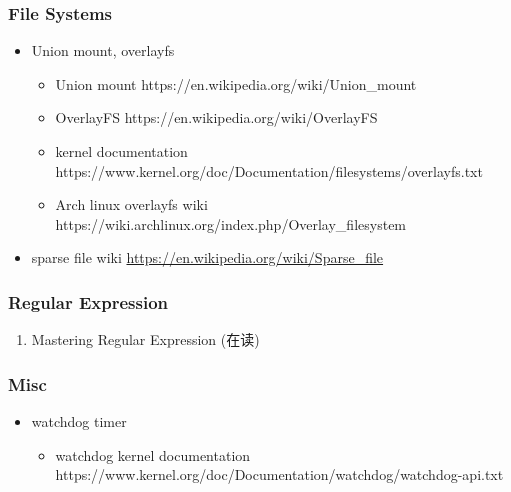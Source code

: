 \documentclass{article}
\begin{document}
\subsubsection{File Systems}
%
\begin{itemize}
    \item Union mount, overlayfs
        \begin{itemize}
            \item Union mount https://en.wikipedia.org/wiki/Union_mount
            \item OverlayFS https://en.wikipedia.org/wiki/OverlayFS
            \item kernel documentation https://www.kernel.org/doc/Documentation/filesystems/overlayfs.txt
            \item Arch linux overlayfs wiki https://wiki.archlinux.org/index.php/Overlay_filesystem
        \end{itemize}
    \item sparse file wiki \url{https://en.wikipedia.org/wiki/Sparse_file}
\end{itemize}
\subsubsection{Regular Expression}
\begin{enumerate}
    \item Mastering Regular Expression (在读)
\end{enumerate}
%
\subsubsection{Misc}
%
\begin{itemize}
    \item watchdog timer
        \begin{itemize}
            \item watchdog kernel documentation https://www.kernel.org/doc/Documentation/watchdog/watchdog-api.txt
        \end{itemize}
\end{itemize}
%
\end{document}
